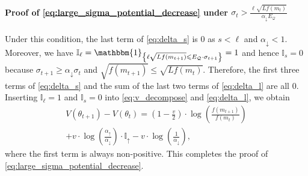 \documentclass[journal]{IEEEtran}
\providecommand{\ind}[1]{\ensuremath{\mathbbm{1}_{\left\{#1\right\}}}} %
\renewcommand{\geq}{\geqslant} %
\renewcommand{\leq}{\leqslant} %
\theoremstyle{definition}
\newcommand{\indup}{\mathbb{I}_{\uparrow}}
\newcommand{\inds}{\mathbb{I}_{s}}
\newcommand{\indl}{\mathbb{I}_{\ell}}
\newcommand{\aup}{\alpha_{\uparrow}}
\newcommand{\adown}{\alpha_{\downarrow}}
\begin{document}
\paragraph*{Proof of \eqref{eq:large_sigma_potential_decrease} under $\sigma_t > \frac{\ell \sqrt{Lf(m_t)}}{\adown  E_\mathcal{Q}}$}

Under this condition, the last term of \eqref{eq:delta_s} is $0$ as $s<\ell$ and $\adown < 1$.
Moreover, we have $\indl = \ind{\ell \sqrt{ L f(m_{t+1})} \leq E_\mathcal{Q} \cdot \sigma_{t+1}} = 1$ and hence $\inds = 0$ because $\sigma_{t+1} \geq \adown\sigma_{t}$ and $\sqrt{ f(m_{t+1})} \leq \sqrt{ L f(m_{t})}$. 
Therefore, the first three terms of \eqref{eq:delta_s} and the sum of the last two terms of \eqref{eq:delta_l} are all $0$. 
Inserting $\indl = 1$ and $\inds = 0$ into \eqref{eq:v_decompose} and \eqref{eq:delta_l}, we obtain
\begin{multline}
V(\theta_{t+1}) - V(\theta_t)
= \left(1-\frac{v}{2}\right)\cdot\log\left(\frac{f(m_{t+1})}{f(m_t)}\right) 
\\
+v\cdot\log\left(\frac{\aup}{\adown}\right)\cdot\indup
-v\cdot\log\left(\frac{1}{\adown}\right)
  ,
\end{multline}
where the first term is always non-positive.
This completes the proof of \eqref{eq:large_sigma_potential_decrease}.
\end{document}
